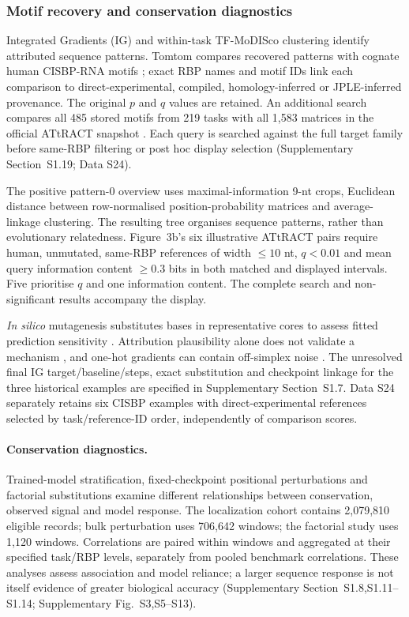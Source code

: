 \documentclass[webpdf,contemporary,large]{oup-authoring-template}
\newcommand{\supfig}[1]{Supplementary Fig.~#1}
\newcommand{\supsect}[1]{Supplementary Section~#1}
\begin{document}
\subsubsection{Motif recovery and conservation diagnostics}\label{subsec:interp}

Integrated Gradients (IG) \citep{sundararajan2017integrated} and within-task TF-MoDISco clustering \citep{shrikumar2018tfmodisco} identify attributed sequence patterns. Tomtom compares recovered patterns with cognate human CISBP-RNA motifs \citep{ray2013compendium,gupta2007tomtom,bailey2015meme}; exact RBP names and motif IDs link each comparison to direct-experimental, compiled, homology-inferred or JPLE-inferred provenance. The original $p$ and $q$ values are retained. An additional search compares all 485 stored motifs from 219 tasks with all 1,583 matrices in the official ATtRACT snapshot \citep{giudice2016attract}. Each query is searched against the full target family before same-RBP filtering or post hoc display selection (\supsect{S1.19}; Data S24).

The positive pattern-0 overview uses maximal-information 9-nt crops, Euclidean distance between row-normalised position-probability matrices and average-linkage clustering. The resulting tree organises sequence patterns, rather than evolutionary relatedness. Figure~3b's six illustrative ATtRACT pairs require human, unmutated, same-RBP references of width $\leq10$ nt, $q<0.01$ and mean query information content $\geq0.3$ bits in both matched and displayed intervals. Five prioritise $q$ and one information content. The complete search and non-significant results accompany the display.

\textit{In silico} mutagenesis substitutes bases in representative cores to assess fitted prediction sensitivity \citep{zhou2015deepsea}. Attribution plausibility alone does not validate a mechanism \citep{adebayo2018sanity}, and one-hot gradients can contain off-simplex noise \citep{majdandzic2023gradient}. The unresolved final IG target/baseline/steps, exact substitution and checkpoint linkage for the three historical examples are specified in \supsect{S1.7}. Data S24 separately retains six CISBP examples with direct-experimental references selected by task/reference-ID order, independently of comparison scores.

\paragraph{Conservation diagnostics.}\label{subsec:perturb_methods}
Trained-model stratification, fixed-checkpoint positional perturbations and factorial substitutions examine different relationships between conservation, observed signal and model response. The localization cohort contains 2,079,810 eligible records; bulk perturbation uses 706,642 windows; the factorial study uses 1,120 windows. Correlations are paired within windows and aggregated at their specified task/RBP levels, separately from pooled benchmark correlations. These analyses assess association and model reliance; a larger sequence response is not itself evidence of greater biological accuracy (\supsect{S1.8,S1.11--S1.14}; \supfig{S3,S5--S13}).
\end{document}
